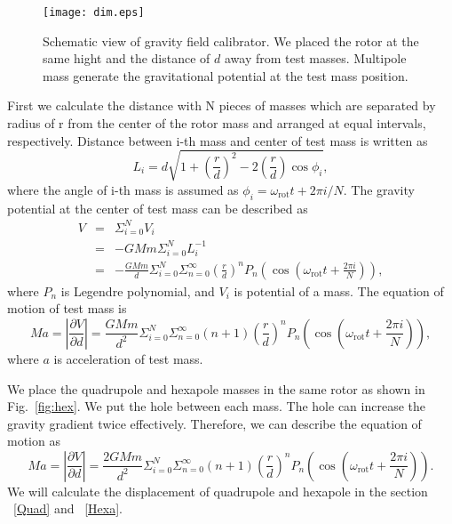 \documentclass[A4]{spie}  %
\begin{document}
\begin{figure}
\begin{center}
\texttt{[image: dim.eps]}
\caption{Schematic view of gravity field calibrator. We placed the rotor at  the same hight and the distance of $d$ away from test masses. Multipole mass generate the gravitational potential at the test mass position.}
\label{fig:dim}
\end{center}
\end{figure}
First we calculate the distance with N pieces of masses which are separated by radius of r from the center of the rotor mass and arranged at equal intervals, respectively.
Distance between i-th mass and center of test mass is written as
\begin{equation}
L_i=d \sqrt{1+\left( \frac{r}{d} \right)^2 -2\left( \frac{r}{d} \right) \cos{\phi_i} },
\end{equation}
where the angle of i-th mass is assumed as $\phi_i=\omega_{\mathrm{rot}} t + 2\pi i/N$.
The gravity potential at the center of test mass can be described as
\begin{eqnarray}
V &=& \Sigma^N_{i=0} V_i \\
&=& -GMm \Sigma^N_{i=0}L_i^{-1}\\
&=&-\frac{GMm}{d} \Sigma^N_{i=0} \Sigma^{\infty}_{n=0} \left( \frac{r}{d} \right)^n P_n\left(\cos{\left(\omega_{\mathrm{rot}} t +\frac{2 \pi i}{N}\right)}\right),
\end{eqnarray}
where $P_n$ is Legendre polynomial, and $V_i$ is potential of a mass. The equation of motion of test mass is 
\begin{equation}
Ma=\left| \frac{\partial V}{\partial{d}} \right| =\frac{GMm}{d^2}\Sigma^N_{i=0} \Sigma^{\infty}_{n=0}(n+1) \left( \frac{r}{d} \right)^n P_n\left(\cos{\left(\omega_{\mathrm{rot}} t +\frac{2 \pi i}{N}\right)}\right),
\end{equation}
where $a$ is acceleration of test mass. 

We place the quadrupole and hexapole masses in the same rotor as shown in Fig.~\ref{fig:hex}. We put the hole between each mass. The hole can increase the gravity gradient twice effectively. Therefore, we can describe the equation of motion as 
\begin{equation}
Ma=\left| \frac{\partial V}{\partial{d}} \right| =\frac{2GMm}{d^2}\Sigma^N_{i=0} \Sigma^{\infty}_{n=0}(n+1) \left( \frac{r}{d} \right)^n P_n\left(\cos{\left(\omega_{\mathrm{rot}} t +\frac{2 \pi i}{N}\right)}\right). \label{eq:EOM}
\end{equation}
We will calculate the displacement of quadrupole and hexapole in the section ~\ref{Quad}  and ~\ref{Hexa}.
\end{document}

